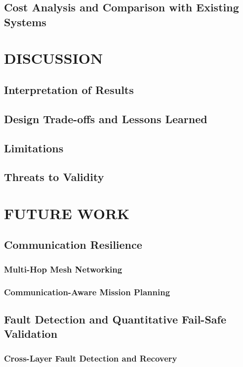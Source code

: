 \section{Cost Analysis and Comparison with Existing Systems}

\chapter{DISCUSSION}
\section{Interpretation of Results} 
\section{Design Trade-offs and Lessons Learned}
\section{Limitations}
\section{Threats to Validity}

\chapter{FUTURE WORK}
\section{Communication Resilience}
\subsection{Multi-Hop Mesh Networking}
\subsection{Communication-Aware Mission Planning}
\section{Fault Detection and Quantitative Fail-Safe Validation}
\subsection{Cross-Layer Fault Detection and Recovery}
